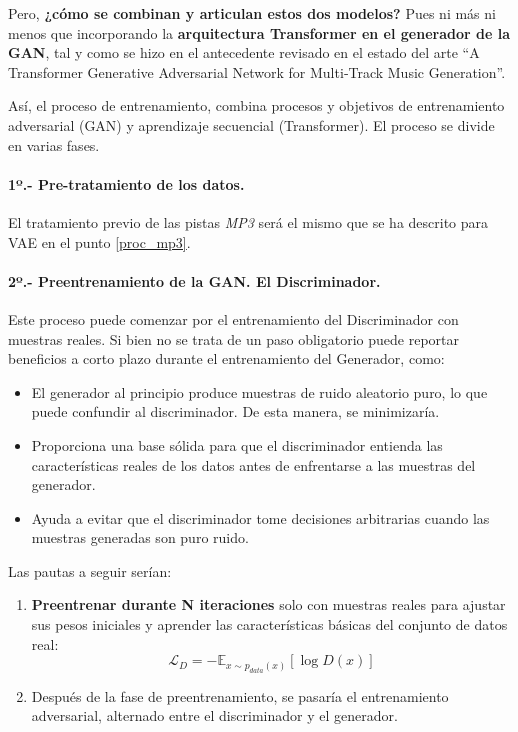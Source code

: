 Pero, \textbf{¿cómo se combinan y articulan estos dos modelos?} Pues ni más ni menos que incorporando la \textbf{arquitectura Transformer en el generador de la GAN}, tal y como se hizo en el antecedente revisado en el estado del arte ``A Transformer Generative Adversarial Network for Multi‐Track Music Generation''\citep{jin2022transformer}.

Así, el proceso de entrenamiento, combina procesos y objetivos de entrenamiento adversarial (GAN) y aprendizaje secuencial (Transformer). El proceso se divide en varias fases.

\paragraph{1º.- Pre-tratamiento de los datos.} 

El tratamiento previo de las pistas \emph{MP3} será el mismo que se ha descrito para VAE en el punto \ref{proc_mp3}.

\paragraph{2º.- Preentrenamiento de la GAN. El Discriminador.} 

Este proceso puede comenzar por el entrenamiento del Discriminador con muestras reales. Si bien no se trata de un paso obligatorio puede reportar beneficios a corto plazo durante el entrenamiento del Generador, como:

\begin{itemize}
    \item El generador al principio produce muestras de ruido aleatorio puro, lo que puede confundir al discriminador. De esta manera, se minimizaría.
    \item Proporciona una base sólida para que el discriminador entienda las características reales de los datos antes de enfrentarse a las muestras del generador.
    \item Ayuda a evitar que el discriminador tome decisiones arbitrarias cuando las muestras generadas son puro ruido.
\end{itemize}

Las pautas a seguir serían:
\begin{enumerate}
    \item \textbf{Preentrenar durante N iteraciones} solo con muestras reales para ajustar sus pesos iniciales y aprender las características básicas del conjunto de datos real:
    \[
    \mathcal{L}_{D} = -\mathbb{E}_{x \sim p_{data}(x)}[\log D(x)]
    \]
    \item Después de la fase de preentrenamiento, se pasaría el entrenamiento adversarial, alternado entre el discriminador y el generador.
\end{enumerate}

